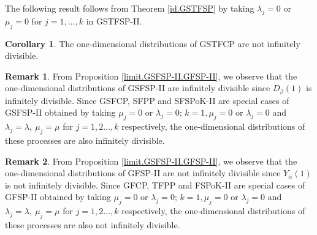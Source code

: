 \documentclass[11pt,oneside,reqno]{amsart}
\theoremstyle{definition}
\newtheorem{remark}{\bf Remark}[section]
\newtheorem{corollary}{Corollary}[section]
\theoremstyle{remarkstyle}
\begin{document}
The following result follows from Theorem \ref{id.GSTFSP} by taking $\lambda_j=0$ or $\mu_j=0$ for $j=1,\ldots,k$  in GSTFSP-II. 
\begin{corollary}
The one-dimensional distributions of GSTFCP are not infinitely divisible.
\end{corollary}

\begin{remark}\label{GSFSPlimit}
From Proposition \ref{limit.GSFSP-II.GFSP-II}, we observe that the one-dimensional distributions of GSFSP-II are infinitely divisible since $D_{\beta}(1)$ is infinitely divisible. Since GSFCP, SFPP and SFSPoK-II are special cases of GSFSP-II obtained by taking $\mu_j=0$ or $\lambda_j=0$; $k=1,\mu_j=0$ or $\lambda_j=0$ and $\lambda_j=\lambda,~\mu_j=\mu$ for $j=1,2\ldots,k$ respectively, the one-dimensional distributions of these processes are also infinitely divisible.  
\end{remark}

\begin{remark}\label{GFSPlimit}
From Proposition \ref{limit.GSFSP-II.GFSP-II}, we observe that the one-dimensional distributions of GFSP-II are not infinitely divisible since $Y_{\alpha}(1)$ is not infinitely divisible. Since GFCP, TFPP and FSPoK-II are special cases of GFSP-II obtained by taking $\mu_j=0$ or $\lambda_j=0$; $k=1,\mu_j=0$ or $\lambda_j=0$ and $\lambda_j=\lambda,~\mu_j=\mu$ for $j=1,2\ldots,k$ respectively, the one-dimensional distributions of these processes are also not infinitely divisible. 
\end{remark}
\end{document}
